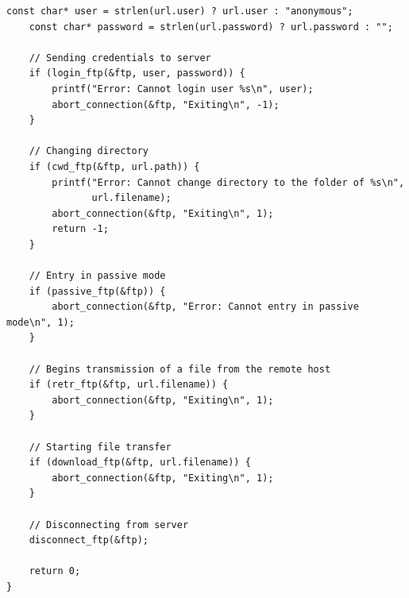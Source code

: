 \documentclass[a4paper,11pt,titlepage]{article}
\begin{document}
\begin{lstlisting}[style=customcwithlines]
    const char* user = strlen(url.user) ? url.user : "anonymous";
    const char* password = strlen(url.password) ? url.password : "";

    // Sending credentials to server
    if (login_ftp(&ftp, user, password)) {
        printf("Error: Cannot login user %s\n", user);
        abort_connection(&ftp, "Exiting\n", -1);
    }

    // Changing directory
    if (cwd_ftp(&ftp, url.path)) {
        printf("Error: Cannot change directory to the folder of %s\n",
               url.filename);
        abort_connection(&ftp, "Exiting\n", 1);
        return -1;
    }

    // Entry in passive mode
    if (passive_ftp(&ftp)) {
        abort_connection(&ftp, "Error: Cannot entry in passive mode\n", 1);
    }

    // Begins transmission of a file from the remote host
    if (retr_ftp(&ftp, url.filename)) {
        abort_connection(&ftp, "Exiting\n", 1);
    }

    // Starting file transfer
    if (download_ftp(&ftp, url.filename)) {
        abort_connection(&ftp, "Exiting\n", 1);
    }

    // Disconnecting from server
    disconnect_ftp(&ftp);

    return 0;
}
\end{lstlisting}
\end{document}
